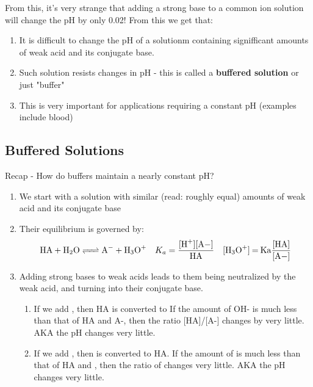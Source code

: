 \documentclass{article}  %
\begin{document}
From this, it's very strange that adding a strong base to a common ion solution will change the pH by only 0.02! From this we get that:
\begin{enumerate}
    \item It is difficult to change the pH of a solutionm containing signifficant amounts of weak acid and its conjugate base.
    \item Such solution resists changes in pH - this is called a \textbf{buffered solution} or just "buffer"
    \item This is very important for applications requiring a constant pH (examples include blood)
\end{enumerate}

\subsection*{Buffered Solutions}
Recap - How do buffers maintain a nearly constant pH?
\begin{enumerate}
    \item We start with a solution with similar (read: roughly equal) amounts of weak acid and its conjugate base
    \item Their equilibrium is governed by:
    \begin{equation*}
        \begin{aligned}
            \ce{HA + H2O <=> A- + H3O+} \quad K_a = \ce{\frac{[H+][A-]}{HA}} \quad \ce{[H3O+] = Ka\frac{[HA]}{[A-]}}
        \end{aligned}
    \end{equation*}
    \item Adding strong bases to weak acids leads to them being neutralized by the weak acid, and turning into their conjugate base. 
    \begin{enumerate}
        \item If we add , then HA is converted to  If the amount of OH- is much less than that of HA and A-, then the ratio [HA]/[A-] changes by very little. AKA the pH changes very little.
        \item If we add , then  is converted to HA. If the amount of  is much less than that of HA and , then the ratio of \ce{[HA]/[A-]} changes very little. AKA the pH changes very little.
    \end{enumerate}
\end{enumerate}
\end{document}
